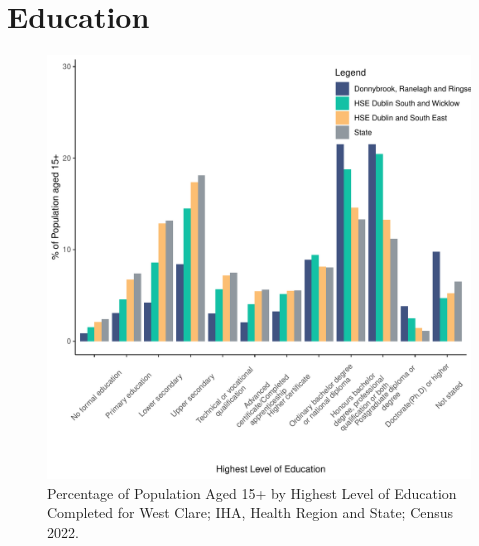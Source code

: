 \documentclass{article}
\begin{document}
\section{Education}\label{sect:Edu}
\begin{figure}[H]
	\centering
	\includegraphics[width = 120mm]{../figures/EduED.pdf}
	\caption{Percentage of Population Aged 15+ by Highest Level of Education Completed for West Clare; IHA, Health Region and State; Census 2022.}
	\label{fig:vbnv}
	\end{figure}
\end{document}
